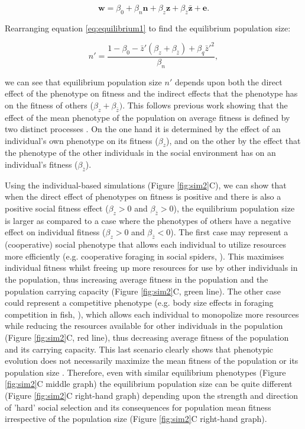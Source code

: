 \documentclass{article}
\begin{document}
\begin{equation} \label{eq: socialselection}
\mathbf{w}=\beta_{0} +\beta_{n} \mathbf{n} + \beta_{z} \mathbf{z}+ \beta_{\bar{z}} \bar{\mathbf{z}}+ \mathbf{e}.
\end{equation}
 
\noindent Rearranging equation \ref{eq:equilibrium1} to find the equilibrium population size:
 
\begin{equation}
n' = \frac{1-\beta_{0} - \bar{z}'(\beta_{z} + \beta_{\bar{z}} )+  \beta_{q} \bar{z}'^2}{\beta_{n}},
\end{equation}

\noindent we can see that equilibrium population size $n'$ depends upon both the direct effect of the phenotype on fitness and the indirect effects that the phenotype has on the fitness of others ($\beta_{z} + \beta_{\bar{z}})$. This follows previous work showing that the effect of the mean phenotype of the population on average fitness is defined by two distinct processes \citep{Engen2020, Lande2007, Abrams1993}. On the one hand it is determined by the effect of an individual's own phenotype on its fitness ($\beta_{z}$), and on the other by the effect that the phenotype of the other individuals in the social environment has on an individual's fitness ($\beta_{\bar{z}}$).

Using the individual-based simulations (Figure \ref{fig:sim2}C), we can show that when the direct effect of phenotypes on fitness is positive and there is also a positive social fitness effect ($\beta_{z}>0$ and $\beta_{\bar{z}}>0$), the equilibrium population size is larger as compared to a case where the phenotypes of others have a negative effect on individual fitness ($\beta_{z}>0$ and $\beta_{\bar{z}}<0$). The first case may represent a (cooperative) social phenotype that allows each individual to utilize resources more efficiently (e.g. cooperative foraging in social spiders, \cite{Majer2018}). This maximises individual fitness whilst freeing up more resources for use by other individuals in the population, thus increasing average fitness in the population and the population carrying capacity (Figure \ref{fig:sim2}C, green line). The other case could represent a competitive phenotype (e.g. body size effects in foraging competition in fish, \cite{Ward2006}), which allows each individual to monopolize more resources while reducing the resources available for other individuals in the population (Figure \ref{fig:sim2}C, red line), thus decreasing average fitness of the population and its carrying capacity. This last scenario clearly shows that phenotypic evolution does not necessarily maximize the mean fitness of the population or its population size \citep{Wright1969, Abrams1993}. Therefore, even with similar equilibrium phenotypes (Figure \ref{fig:sim2}C middle graph) the equilibrium population size can be quite different (Figure \ref{fig:sim2}C right-hand graph) depending upon the strength and direction of 'hard' social selection and its consequences for population mean fitness irrespective of the population size (Figure \ref{fig:sim2}C right-hand graph).
\end{document}
